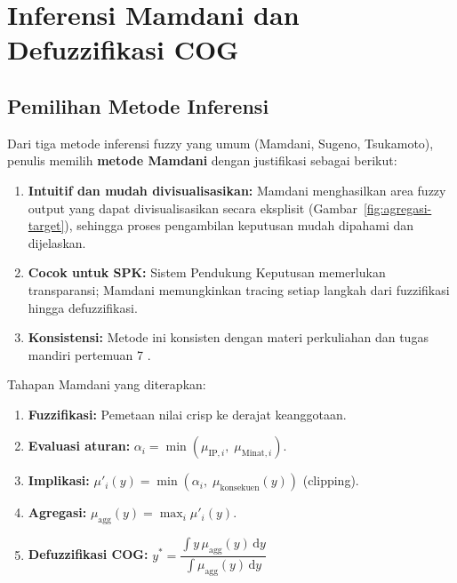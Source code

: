 \documentclass[conference]{IEEEtran}
\begin{document}
\section{Inferensi Mamdani dan Defuzzifikasi COG}
\label{sec:inferensi}

\subsection{Pemilihan Metode Inferensi}

Dari tiga metode inferensi fuzzy yang umum (Mamdani, Sugeno, Tsukamoto),
penulis memilih \textbf{metode Mamdani} dengan justifikasi sebagai berikut:

\begin{enumerate}[nosep]
  \item \textbf{Intuitif dan mudah divisualisasikan:}
        Mamdani menghasilkan area fuzzy output yang dapat divisualisasikan
        secara eksplisit (Gambar~\ref{fig:agregasi-target}), sehingga
        proses pengambilan keputusan mudah dipahami dan dijelaskan.
  \item \textbf{Cocok untuk SPK:} Sistem Pendukung Keputusan memerlukan
        transparansi; Mamdani memungkinkan tracing setiap langkah
        dari fuzzifikasi hingga defuzzifikasi.
  \item \textbf{Konsistensi:} Metode ini konsisten dengan materi
        perkuliahan dan tugas mandiri pertemuan 7 \cite{mulki2026}.
\end{enumerate}

\noindent
Tahapan Mamdani yang diterapkan:
\begin{enumerate}[nosep]
  \item \textbf{Fuzzifikasi:} Pemetaan nilai crisp ke derajat keanggotaan.
  \item \textbf{Evaluasi aturan:} $\alpha_i = \min(\mu_{\text{IP},i},\;
        \mu_{\text{Minat},i})$.
  \item \textbf{Implikasi:} $\mu'_i(y) = \min(\alpha_i,\;
        \mu_{\text{konsekuen}}(y))$ (clipping).
  \item \textbf{Agregasi:} $\mu_{\text{agg}}(y) = \max_i \mu'_i(y)$.
  \item \textbf{Defuzzifikasi COG:}
        $y^* = \dfrac{\int y\,\mu_{\text{agg}}(y)\,\mathrm{d}y}
                     {\int \mu_{\text{agg}}(y)\,\mathrm{d}y}$
\end{enumerate}
\end{document}
